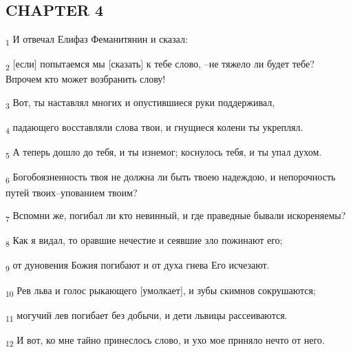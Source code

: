 \subsection{CHAPTER 4}
\begin{tcolorbox}
\textsubscript{1} И отвечал Елифаз Феманитянин и сказал:
\end{tcolorbox}
\begin{tcolorbox}
\textsubscript{2} [если] попытаемся мы [сказать] к тебе слово, --не тяжело ли будет тебе? Впрочем кто может возбранить слову!
\end{tcolorbox}
\begin{tcolorbox}
\textsubscript{3} Вот, ты наставлял многих и опустившиеся руки поддерживал,
\end{tcolorbox}
\begin{tcolorbox}
\textsubscript{4} падающего восставляли слова твои, и гнущиеся колени ты укреплял.
\end{tcolorbox}
\begin{tcolorbox}
\textsubscript{5} А теперь дошло до тебя, и ты изнемог; коснулось тебя, и ты упал духом.
\end{tcolorbox}
\begin{tcolorbox}
\textsubscript{6} Богобоязненность твоя не должна ли быть твоею надеждою, и непорочность путей твоих--упованием твоим?
\end{tcolorbox}
\begin{tcolorbox}
\textsubscript{7} Вспомни же, погибал ли кто невинный, и где праведные бывали искореняемы?
\end{tcolorbox}
\begin{tcolorbox}
\textsubscript{8} Как я видал, то оравшие нечестие и сеявшие зло пожинают его;
\end{tcolorbox}
\begin{tcolorbox}
\textsubscript{9} от дуновения Божия погибают и от духа гнева Его исчезают.
\end{tcolorbox}
\begin{tcolorbox}
\textsubscript{10} Рев льва и голос рыкающего [умолкает], и зубы скимнов сокрушаются;
\end{tcolorbox}
\begin{tcolorbox}
\textsubscript{11} могучий лев погибает без добычи, и дети львицы рассеиваются.
\end{tcolorbox}
\begin{tcolorbox}
\textsubscript{12} И вот, ко мне тайно принеслось слово, и ухо мое приняло нечто от него.
\end{tcolorbox}
